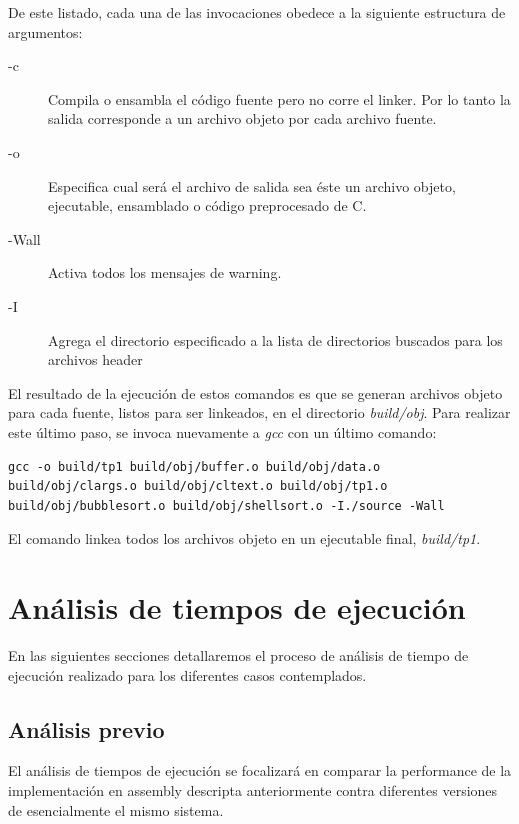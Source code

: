 \documentclass[a4paper,11pt]{article}
\begin{document}
De este listado, cada una de las invocaciones obedece a la siguiente estructura
de argumentos:

\begin{description}

  \item[-c] Compila o ensambla el código fuente pero no corre el linker.  Por
    lo tanto la salida corresponde a un archivo objeto por cada archivo fuente.

  \item[-o] Especifica cual será el archivo de salida sea éste un archivo
    objeto, ejecutable, ensamblado o código preprocesado de C.

  \item[-Wall] Activa todos los mensajes de warning.

  \item[-I] Agrega el directorio especificado a la lista de directorios
    buscados para los archivos header

\end{description}

El resultado de la ejecución de estos comandos es que se generan archivos
objeto para cada fuente, listos para ser linkeados, en el directorio
\textit{build/obj}. Para realizar este último paso, se invoca nuevamente a
\textit{gcc} con un último comando:

\begin{lstlisting}
gcc -o build/tp1 build/obj/buffer.o build/obj/data.o build/obj/clargs.o build/obj/cltext.o build/obj/tp1.o build/obj/bubblesort.o build/obj/shellsort.o -I./source -Wall 
\end{lstlisting}

El comando linkea todos los archivos objeto en un ejecutable final,
\textit{build/tp1}.

\section{Análisis de tiempos de ejecución}

En las siguientes secciones detallaremos el proceso de análisis de tiempo de
ejecución realizado para los diferentes casos contemplados.

\subsection{Análisis previo}\label{sec:tiempos}

El análisis de tiempos de ejecución se focalizará en comparar la performance de
la implementación en assembly descripta anteriormente contra diferentes
versiones de esencialmente el mismo sistema.
\end{document}
